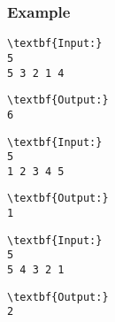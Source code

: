 \subsubsection{Example}
\begin{verbatim}
\textbf{Input:}
5
5 3 2 1 4\end{verbatim}
\begin{verbatim}
\textbf{Output:}
6\end{verbatim}
\begin{verbatim}
\textbf{Input:}
5
1 2 3 4 5\end{verbatim}
\begin{verbatim}
\textbf{Output:}
1\end{verbatim}
\begin{verbatim}
\textbf{Input:}
5
5 4 3 2 1\end{verbatim}
\begin{verbatim}
\textbf{Output:}
2\end{verbatim}